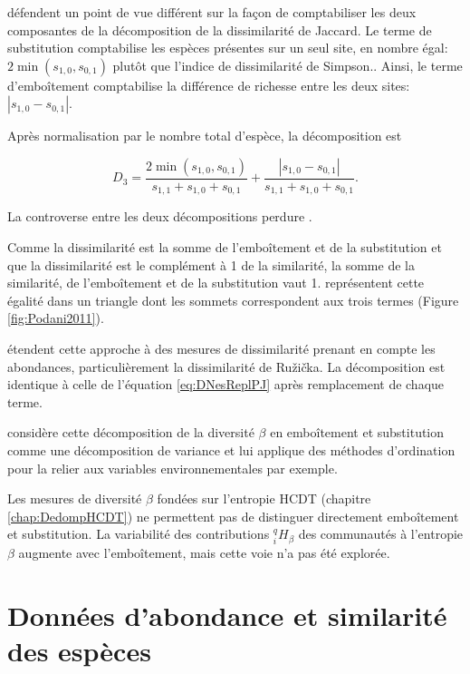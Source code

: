 \documentclass[
  11pt,
  french,
  a4paper,
  extrafontsizes,onecolumn,openright
  ]{memoir}
\begin{document}
\normalsize

\textcite{Podani2011} défendent un point de vue différent sur la façon de comptabiliser les deux composantes de la décomposition de la dissimilarité de Jaccard.
Le terme de substitution comptabilise les espèces présentes sur un seul site, en nombre égal: \(2\min(s_{1,0},s_{0,1})\) plutôt que l'indice de dissimilarité de Simpson..
Ainsi, le terme d'emboîtement comptabilise la différence de richesse entre les deux sites: \(|s_{1,0}-s_{0,1}|\).

Après normalisation par le nombre total d'espèce, la décomposition est

\begin{equation}
  \label{eq:DNesReplPJ}
  D_3
  = \frac{2\min(s_{1,0},s_{0,1})}{s_{1,1} + s_{1,0} + s_{0,1}}
  + \frac{|s_{1,0}-s_{0,1}|}{s_{1,1} + s_{1,0} + s_{0,1}}.
\end{equation}

La controverse entre les deux décompositions perdure \autocite{Podani2016}.

Comme la dissimilarité est la somme de l'emboîtement et de la substitution et que la dissimilarité est le complément à 1 de la similarité, la somme de la similarité, de l'emboîtement et de la substitution vaut 1.
\textcite{Podani2011} représentent cette égalité dans un triangle dont les sommets correspondent aux trois termes (Figure \ref{fig:Podani2011}).

\textcite{Podani2013} étendent cette approche à des mesures de dissimilarité prenant en compte les abondances, particulièrement la dissimilarité de Ružička.
La décomposition est identique à celle de l'équation \eqref{eq:DNesReplPJ} après remplacement de chaque terme.

\textcite{Legendre2014} considère cette décomposition de la diversité \(\beta\) en emboîtement et substitution comme une décomposition de variance et lui applique des méthodes d'ordination pour la relier aux variables environnementales par exemple.

Les mesures de diversité \(\beta\) fondées sur l'entropie HCDT (chapitre \ref{chap:DedompHCDT}) ne permettent pas de distinguer directement emboîtement et substitution.
La variabilité des contributions \(^{q}_{i}\!H_{\beta}\) des communautés à l'entropie \(\beta\) augmente avec l'emboîtement, mais cette voie n'a pas été explorée.

\hypertarget{donnuxe9es-dabondance-et-similarituxe9-des-espuxe8ces}{%
\section{Données d'abondance et similarité des espèces}\label{donnuxe9es-dabondance-et-similarituxe9-des-espuxe8ces}}
\end{document}
